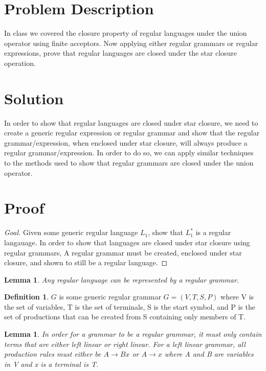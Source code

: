 \documentclass{assignment-x}
\newtheorem{lemma}[theorem]{Lemma}
\theoremstyle{definition}
\newtheorem{definition}{Definition}[section]
\theoremstyle{remark}
\begin{document}
\maketitle
\pagebreak

\section{Problem Description}
In class we covered the closure property of regular languages under the union operator using finite acceptors. Now applying either regular grammars or regular expressions, prove that regular languages are closed under the star closure operation.

\section{Solution}
In order to show that regular languages are closed under star closure, we need to create a generic regular expression or regular grammar and show that the regular grammar/expression, when enclosed under star closure, will always produce a regular grammar/expression. In order to do so, we can apply similar techniques to the methods used to show that regular grammars are closed under the union operator.

\section{Proof}
\begin{proof}[Goal]
    Given some generic regular language $L_1$, show that $L_1^*$ is a regular langauage. In order to show that languages are closed under star closure using regular grammars, A regular grammar must be created, enclosed under star closure, and shown to still be a regular language.
\end{proof}
\begin{lemma}
    Any regular language can be represented by a regular grammar.
\end{lemma}
\begin{definition}
     $G$ is some generic regular grammar $G  = (V,T,S,P)$ where V is the set of variables, T is the set of terminals, S is the start symbol, and P is the set of productions that can be created from S containing only members of T.    
\end{definition}
\begin{lemma}
    In order for a grammar to be a regular grammar, it must only contain terms that are either left linear or right linear. For a left linear grammar, all production rules must either be $A \rightarrow Bx$ or $A \rightarrow x$ where A and B are variables in V and x is a terminal is T. 
\end{lemma}
\end{document}
